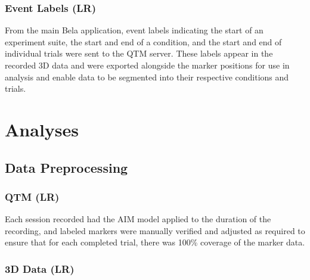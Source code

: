 \documentclass[10pt,a4paper,onecolumn]{article}
\begin{document}
\hypertarget{event-labels-lr}{%
\subsubsection{Event Labels (LR)}\label{event-labels-lr}}

From the main Bela application, event labels indicating the start of an experiment suite, the start and end of a condition, and the start and end of individual trials were sent to the QTM server. These labels appear in the recorded 3D data and were exported alongside the marker positions for use in analysis and enable data to be segmented into their respective conditions and trials.

\hypertarget{analyses}{%
\section{Analyses}\label{analyses}}

\hypertarget{data-preprocessing}{%
\subsection{Data Preprocessing}\label{data-preprocessing}}

\hypertarget{qtm-lr}{%
\subsubsection{QTM (LR)}\label{qtm-lr}}

Each session recorded had the AIM model applied to the duration of the recording, and labeled markers were manually verified and adjusted as required to ensure that for each completed trial, there was 100\% coverage of the marker data.

\hypertarget{d-data-lr}{%
\subsubsection{3D Data (LR)}\label{d-data-lr}}
\end{document}

